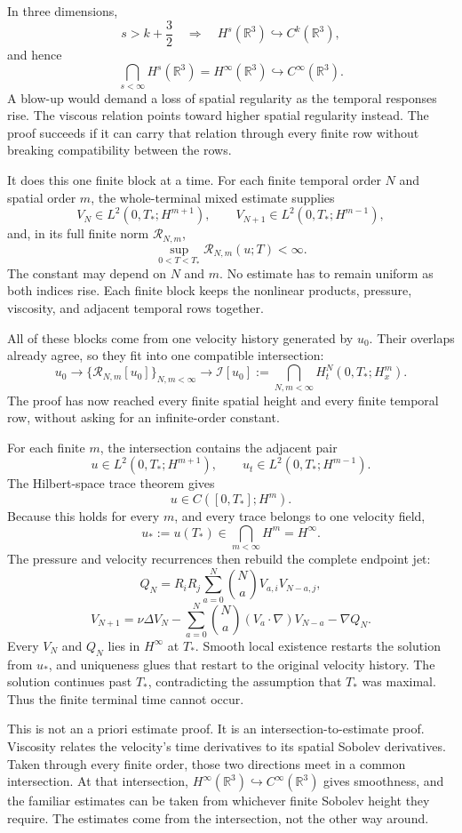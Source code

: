 \documentclass[11pt]{article}
\begin{document}
In three dimensions,
\[
s>k+\frac32
\quad\Longrightarrow\quad
H^s(\mathbb R^3)\hookrightarrow C^k(\mathbb R^3),
\]
and hence
\[
\bigcap_{s<\infty}H^s(\mathbb R^3)
=H^\infty(\mathbb R^3)
\hookrightarrow C^\infty(\mathbb R^3).
\]
A blow-up would demand a loss of spatial regularity as the temporal responses rise. The viscous relation points toward higher spatial regularity instead. The proof succeeds if it can carry that relation through every finite row without breaking compatibility between the rows.

It does this one finite block at a time. For each finite temporal order \(N\) and spatial order \(m\), the whole-terminal mixed estimate supplies
\[
V_N\in L^2(0,T_*;H^{m+1}),
\qquad
V_{N+1}\in L^2(0,T_*;H^{m-1}),
\]
and, in its full finite norm \(\mathcal R_{N,m}\),
\[
\sup_{0<T<T_*}\mathcal R_{N,m}(u;T)<\infty.
\]
The constant may depend on \(N\) and \(m\). No estimate has to remain uniform as both indices rise. Each finite block keeps the nonlinear products, pressure, viscosity, and adjacent temporal rows together.

All of these blocks come from one velocity history generated by \(u_0\). Their overlaps already agree, so they fit into one compatible intersection:
\[
u_0
\longrightarrow
\{\mathcal R_{N,m}[u_0]\}_{N,m<\infty}
\longrightarrow
\mathcal I[u_0]
:=
\bigcap_{N,m<\infty}H_t^N(0,T_*;H_x^m).
\]
The proof has now reached every finite spatial height and every finite temporal row, without asking for an infinite-order constant.

For each finite \(m\), the intersection contains the adjacent pair
\[
u\in L^2(0,T_*;H^{m+1}),
\qquad
u_t\in L^2(0,T_*;H^{m-1}).
\]
The Hilbert-space trace theorem gives
\[
u\in C([0,T_*];H^m).
\]
Because this holds for every \(m\), and every trace belongs to one velocity field,
\[
u_*:=u(T_*)\in\bigcap_{m<\infty}H^m=H^\infty.
\]
The pressure and velocity recurrences then rebuild the complete endpoint jet:
\[
Q_N
=R_iR_j\sum_{a=0}^{N}\binom NaV_{a,i}V_{N-a,j},
\]
\[
V_{N+1}
=\nu\Delta V_N
-\sum_{a=0}^{N}\binom Na(V_a\cdot\nabla)V_{N-a}
-\nabla Q_N.
\]
Every \(V_N\) and \(Q_N\) lies in \(H^\infty\) at \(T_*\). Smooth local existence restarts the solution from \(u_*\), and uniqueness glues that restart to the original velocity history. The solution continues past \(T_*\), contradicting the assumption that \(T_*\) was maximal. Thus the finite terminal time cannot occur.

This is not an a priori estimate proof. It is an intersection-to-estimate proof. Viscosity relates the velocity's time derivatives to its spatial Sobolev derivatives. Taken through every finite order, those two directions meet in a common intersection. At that intersection, \(H^\infty(\mathbb R^3)\hookrightarrow C^\infty(\mathbb R^3)\) gives smoothness, and the familiar estimates can be taken from whichever finite Sobolev height they require. The estimates come from the intersection, not the other way around.
\end{document}
